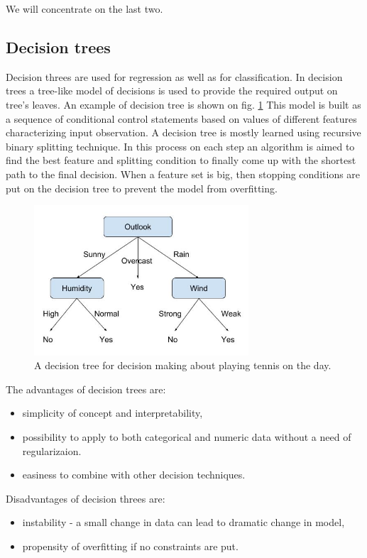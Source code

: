 We will concentrate on the last two.

\subsection{Decision trees}
Decision threes are used for regression as well as for classification. In decision trees a tree-like model of decisions is used to provide the required output on tree's leaves. An example of decision tree is shown on fig. \ref{fig:decision-tree} This model is built as a sequence of conditional control statements based on values of different features characterizing input observation. A decision tree is mostly learned using recursive binary splitting technique. In this process on each step an algorithm is aimed to find the best feature and splitting condition to finally come up with the shortest path to the final decision. When a feature set is big, then stopping conditions are put on the decision tree to prevent the model from overfitting. 

\begin{figure}[h]
    \centering
    \includegraphics[width=8cm]{Images/Decision-tree.png}
    \caption{A decision tree for decision making about playing tennis on the day.}
    \label{fig:decision-tree}
\end{figure}

The advantages of decision trees are:
\begin{itemize}
	\item simplicity of concept and interpretability,
	\item possibility to apply to both categorical and numeric data without a need of regularizaion. 
	\item easiness to combine with other decision techniques.
\end{itemize}

Disadvantages of decision threes are:
\begin{itemize}
	\item instability - a small change in data can lead to dramatic change in model,
	\item propensity of overfitting if no constraints are put.
\end{itemize}


